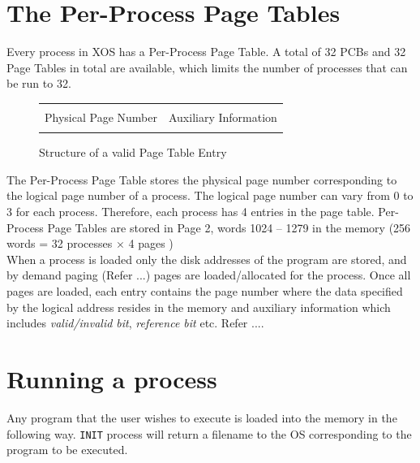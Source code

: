 \documentclass[10pt]{report}
\begin{document}
\section{The Per-Process Page Tables}
\label{lbl:pgtbl}
Every process in XOS has a Per-Process Page Table. A total of 32 PCBs and 32 Page Tables in total are available, which limits the number of processes that can be run to 32. \\

		\begin{figure}[htp!]
		\centering
		\begin{tabular}{|c|c|}
		\hline
		  	 	& 			\\ 
		 	Physical Page Number & Auxiliary Information  \\
			 	& 			\\  \hline
		\end{tabular}
		\caption{Structure of a valid Page Table Entry}
	\end{figure}


The Per-Process Page Table stores the physical page number corresponding to the logical page number of a process. The logical page number can vary from 0 to 3 for each process.  Therefore, each process has 4 entries in the page table. Per-Process Page Tables are stored in Page 2, words 1024 -- 1279 in the memory (256 words = 32 processes $\times$ 4 pages )\\

When a process is loaded only the disk addresses of the program are stored, and by demand paging (Refer ...) pages are loaded/allocated for the process.	 Once all pages are loaded, each entry contains the page number where the data specified by the logical address resides in the memory and auxiliary information which includes \textit{valid/invalid bit}, \textit{reference bit} etc. Refer ....


\section{Running a process}

Any program that the user wishes to execute is loaded into the memory in the following way. \texttt{INIT} process will return a filename to the OS corresponding to the program to be executed.
\end{document}
